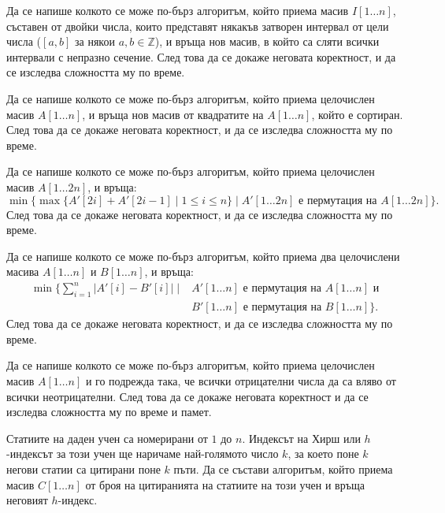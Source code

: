 \begin{problem}
Да се напише колкото се може по-бърз алгоритъм, който приема масив $I[1 \dots n]$, съставен от двойки числа, които представят някакъв затворен интервал от цели числа ($[a, b]$ за някои $a, b \in \mathbb{Z}$), и връща нов масив, в който са сляти всички интервали с непразно сечение.
След това да се докаже неговата коректност, и да се изследва сложността му по време.
\end{problem}

\begin{problem}
Да се напише колкото се може по-бърз алгоритъм, който приема целочислен масив $A[1 \dots n]$, и връща нов масив от квадратите на $A[1 \dots n]$, който е сортиран.
След това да се докаже неговата коректност, и да се изследва сложността му по време.
\end{problem}

\begin{problem}
Да се напише колкото се може по-бърз алгоритъм, който приема целочислен масив $A[1 \dots 2n]$, и връща:
\[
    \min\{ \max \{ A'[2i] + A'[2i - 1] \mid 1 \leq i \leq n \} \mid A'[1 \dots 2n] \text{ е пермутация на } A[1 \dots 2n] \}.
\]
След това да се докаже неговата коректност, и да се изследва сложността му по време.
\end{problem}

\begin{problem}
Да се напише колкото се може по-бърз алгоритъм, който приема два целочислени масива $A[1 \dots n]$ и $B[1 \dots n]$, и връща:
\begin{align*}
    \min \{ \sum\limits_{i = 1}^n |A'[i] - B'[i]| \mid & A'[1 \dots n] \text{ е пермутация на } A[1 \dots n] \text{ и} \\
                                                       & B'[1 \dots n] \text{ е пермутация на } B[1 \dots n] \}.
\end{align*}
След това да се докаже неговата коректност, и да се изследва сложността му по време.
\end{problem}

\begin{problem}
Да се напише колкото се може по-бърз алгоритъм, който приема целочислен масив $A[1 \dots n]$ и го подрежда така, че всички отрицателни числа да са вляво от всички неотрицателни.
След това да се докаже неговата коректност и да се изследва сложността му по време и памет.
\end{problem}

\begin{problem}
Статиите на даден учен са номерирани от $1$ до $n$.
Индексът на Хирш или $h$-индексът за този учен ще наричаме най-голямото число $k$, за което поне $k$ негови статии са цитирани поне $k$ пъти.
Да се състави алгоритъм, който приема масив $C[1 \dots n]$ от броя на цитиранията на статиите на този учен и връща неговият $h$-индекс.
\end{problem}